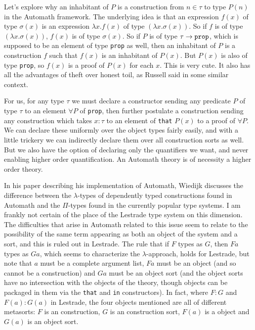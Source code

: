 \documentclass[12pt]{article}
\begin{document}
Let's explore why an inhabitant of $P$ is a construction from $n \in \tau$ to type $P(n)$ in the Automath framework.  The underlying idea is that an expression $f(x)$ of type $\sigma(x)$  is an expression
$\lambda x.f(x)$ of type $(\lambda x.\sigma( x))$.  So if $f$ is of type $(\lambda x.\sigma(x))$, $f(x)$ is of type $\sigma(x)$.  So if $P$ is of type $\tau \rightarrow {\tt prop}$,
which is supposed to be an element of type {\tt prop} as well, then an inhabitant of $P$ is a construction $f$ such that $f(x)$ is an inhabitant of $P(x)$.  But $P(x)$ is also of type
{\tt prop}, so $f(x)$ is a proof of $P(x)$ for each $x$.   This is very cute.  It also has all the advantages of theft over honest toil, as Russell said in some similar context.

For us, for any type $\tau$ we must  declare a constructor sending any predicate $P$ of type $\tau$ to an element $\forall P$ of {\tt prop}, then further postulate
a construction sending any construction which takes $x : \tau$ to an element of {\tt that} $P(x)$ to a proof of $\forall P$.  We can declare these uniformly over the object types
fairly easily, and with a little trickery we can indirectly declare them over all construction sorts as well.  But we also have the option of declaring only the quantifiers we want,
and never enabling higher order quantification.  An Automath theory is of necessity a higher order theory.

In his paper \cite{aut} describing his implementation \cite{freek} of Automath, Wiedijk discusses the difference between the $\lambda$-types of dependently typed constructions
found in Automath and the $\Pi$-types found in the currently popular type systems.  I am frankly not certain of the place of the Lestrade type system on this dimension.  The difficulties that arise in Automath related to this issue seem to relate to the possibility of the same term appearing as both an object of the system and a sort, and this is ruled out in Lestrade.
The rule that if $F$ types as $G$, then $Fa$ types as $Ga$, which seems to characterize the $\lambda$-approach, holds for Lestrade, but note that $a$ must be a complete argument list,
$Fa$ must be an object (and so cannot be a construction) and $Ga$ must be an object sort (and the object sorts have no intersection with the objects of the theory, though objects can be packaged in them via the {\tt that} and {\tt in} constructors).  In fact, where $F:G$ and $F(a):G(a)$ in Lestrade, the four objects mentioned are all of different metasorts:  $F$ is an construction,
$G$ is an construction sort, $F(a)$ is a object and $G(a)$ is an object sort.
\end{document}
